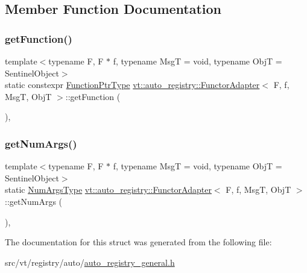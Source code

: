 \subsection{Member Function Documentation}
\mbox{\label{structvt_1_1auto__registry_1_1_functor_adapter_ab9c55cf5835e703ff4aef8054ef068f2}} 
\subsubsection{\texorpdfstring{get\+Function()}{getFunction()}}
{\footnotesize\ttfamily template$<$typename F, F $\ast$ f, typename MsgT = void, typename ObjT = Sentinel\+Object$>$ \\
static constexpr \hyperlink{structvt_1_1auto__registry_1_1_functor_adapter_a8d0182e89f1d807d0221826428285a49}{Function\+Ptr\+Type} \hyperlink{structvt_1_1auto__registry_1_1_functor_adapter}{vt\+::auto\+\_\+registry\+::\+Functor\+Adapter}$<$ F, f, MsgT, ObjT $>$\+::get\+Function (\begin{DoxyParamCaption}{ }\end{DoxyParamCaption})\hspace{0.3cm}{\ttfamily [inline]}, {\ttfamily [static]}}

\mbox{\label{structvt_1_1auto__registry_1_1_functor_adapter_a0c7f5117f097c8922a9785bc84850b74}} 
\subsubsection{\texorpdfstring{get\+Num\+Args()}{getNumArgs()}}
{\footnotesize\ttfamily template$<$typename F, F $\ast$ f, typename MsgT = void, typename ObjT = Sentinel\+Object$>$ \\
static \hyperlink{namespacevt_1_1auto__registry_aebda1d9d765bc9147dc654ad0712c936}{Num\+Args\+Type} \hyperlink{structvt_1_1auto__registry_1_1_functor_adapter}{vt\+::auto\+\_\+registry\+::\+Functor\+Adapter}$<$ F, f, MsgT, ObjT $>$\+::get\+Num\+Args (\begin{DoxyParamCaption}{ }\end{DoxyParamCaption})\hspace{0.3cm}{\ttfamily [inline]}, {\ttfamily [static]}}



The documentation for this struct was generated from the following file\+:\begin{DoxyCompactItemize}
\item 
src/vt/registry/auto/\hyperlink{auto__registry__general_8h}{auto\+\_\+registry\+\_\+general.\+h}\end{DoxyCompactItemize}
